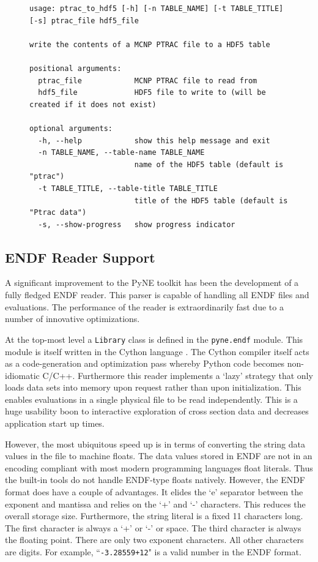 \documentclass{anstrans}
\begin{document}
\begin{figure}[htbp]
\begin{lstlisting}[frame=single,basicstyle=\scriptsize\ttfamily,label=fig_ptractohdf5,caption=Usage description of the PTRAC to HDF5 command line utility.]
usage: ptrac_to_hdf5 [-h] [-n TABLE_NAME] [-t TABLE_TITLE] [-s] ptrac_file hdf5_file

write the contents of a MCNP PTRAC file to a HDF5 table

positional arguments:
  ptrac_file            MCNP PTRAC file to read from
  hdf5_file             HDF5 file to write to (will be created if it does not exist)

optional arguments:
  -h, --help            show this help message and exit
  -n TABLE_NAME, --table-name TABLE_NAME
                        name of the HDF5 table (default is "ptrac")
  -t TABLE_TITLE, --table-title TABLE_TITLE
                        title of the HDF5 table (default is "Ptrac data")
  -s, --show-progress   show progress indicator
\end{lstlisting}
\end{figure}

\subsection{ENDF Reader Support}

A significant improvement to the PyNE toolkit has been the development of 
a fully fledged ENDF \cite{herman2009endf} reader.  This parser is capable 
of handling all ENDF files and evaluations. The performance of the reader is 
extraordinarily fast due to a number of innovative optimizations.

At the top-most level a \texttt{Library} class is defined in the \texttt{pyne.endf}
module.  This module is itself written in the Cython language \cite{behnel2010cython}.
The Cython compiler itself acts as a code-generation and optimization pass whereby
Python code becomes non-idiomatic C/C++.  Furthermore this reader implements a
`lazy' strategy that only loads data sets into memory upon request rather 
than upon initialization.  This enables evaluations in a single physical file to be 
read independently.  This is a huge usability boon to interactive exploration of 
cross section data and decreases application start up times.

However, the most ubiquitous speed up is in terms of converting the string
data values in the file to machine floats.  The data values stored in ENDF 
are not in an encoding compliant with
most modern programming languages float literals. Thus the built-in tools do not 
handle ENDF-type floats natively.  However, the ENDF format does have a couple
of advantages.  It elides the `e' separator between the exponent and mantissa and
relies on the `+' and `-' characters.  This reduces the overall storage size.
Furthermore, the string literal is a fixed 11 characters long. The first character
is always a `+' or `-' or space.  The third character is always the floating point.
There are only two exponent characters. All other characters are digits.  
For example, ``\texttt{-3.28559+12}" is a valid number in the ENDF format.
\end{document}
